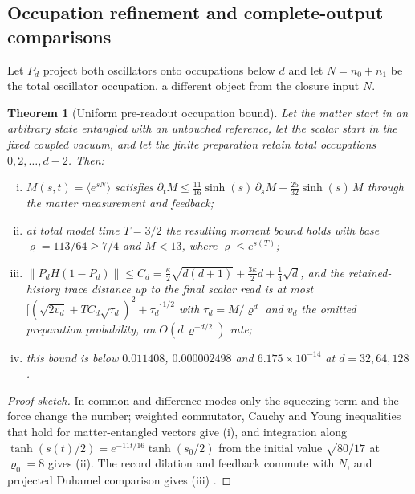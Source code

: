 \documentclass[11pt]{article}
\newtheorem{theorem}{Theorem}[section]
\theoremstyle{definition}
\theoremstyle{remark}
\theoremstyle{plain}
\begin{document}
\subsection{Occupation refinement and complete-output comparisons}
\label{sec:occupation}

Let $P_d$ project both oscillators onto occupations below $d$ and let
$N=n_0+n_1$ be the total oscillator occupation, a different object from the
closure input $N$.

\begin{theorem}[Uniform pre-readout occupation bound]
\label{thm:occupation}
Let the matter start in an arbitrary state entangled with an untouched
reference, let the scalar start in the fixed coupled vacuum, and let the
finite preparation retain total occupations $0,2,\dots,d-2$. Then:
\begin{enumerate}[(i)]
\item $M(s,t)=\langle e^{sN}\rangle$ satisfies
$\partial_tM\le\frac{11}{16}\sinh(s)\,\partial_sM+\frac{25}{32}\sinh(s)\,M$
through the matter measurement and feedback;
\item at total model time $T=3/2$ the resulting moment bound holds with base
$\varrho=113/64\ge7/4$ and $M<13$, where $\varrho\le e^{s(T)}$;
\item $\lVert P_dH(1-P_d)\rVert\le C_d=\frac\kappa2\sqrt{d(d+1)}+\frac{3\kappa}2d+\frac14\sqrt d$,
and the retained-history trace distance up to the final scalar read is at
most $\bigl[(\sqrt{2v_d}+TC_d\sqrt{\tau_d})^2+\tau_d\bigr]^{1/2}$ with
$\tau_d=M/\varrho^d$ and $v_d$ the omitted preparation probability, an
$O(d\,\varrho^{-d/2})$ rate;
\item this bound is below $0.011408$, $0.000002498$ and
$6.175\times10^{-14}$ at $d=32,64,128$.
\end{enumerate}
\end{theorem}

\begin{proof}[Proof sketch]
In common and difference modes only the squeezing term and the force change
the number; weighted commutator, Cauchy and Young inequalities that hold for
matter-entangled vectors give (i), and integration along
$\tanh(s(t)/2)=e^{-11t/16}\tanh(s_0/2)$ from the initial value
$\sqrt{80/17}$ at $\varrho_0=8$ gives (ii). The record dilation and feedback
commute with $N$, and projected Duhamel comparison gives (iii) \cite{csOCC}.
\end{proof}
\end{document}
